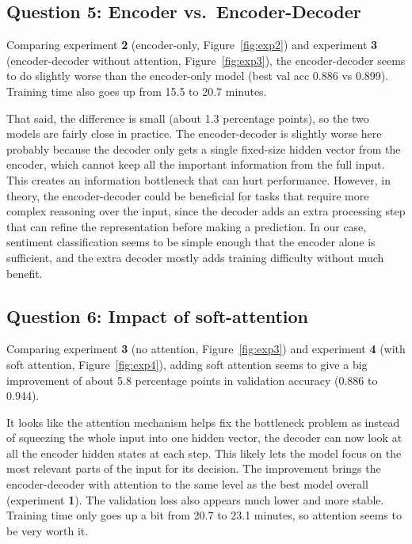\documentclass{article}
\begin{document}
\subsection*{Question 5: Encoder vs.\ Encoder-Decoder}

Comparing experiment \textbf{2} (encoder-only, Figure~\ref{fig:exp2}) and experiment \textbf{3} (encoder-decoder without attention, Figure~\ref{fig:exp3}), the encoder-decoder seems to do slightly worse than the encoder-only model (best val acc 0.886 vs 0.899). Training time also goes up from 15.5 to 20.7 minutes.

That said, the difference is small (about 1.3 percentage points), so the two models are fairly close in practice. The encoder-decoder is slightly worse here probably because the decoder only gets a single fixed-size hidden vector from the encoder, which cannot keep all the important information from the full input. This creates an information bottleneck that can hurt performance. However, in theory, the encoder-decoder could be beneficial for tasks that require more complex reasoning over the input, since the decoder adds an extra processing step that can refine the representation before making a prediction. In our case, sentiment classification seems to be simple enough that the encoder alone is sufficient, and the extra decoder mostly adds training difficulty without much benefit.

\subsection*{Question 6: Impact of soft-attention}

Comparing experiment \textbf{3} (no attention, Figure~\ref{fig:exp3}) and experiment \textbf{4} (with soft attention, Figure~\ref{fig:exp4}), adding soft attention seems to give a big improvement of about 5.8 percentage points in validation accuracy (0.886 to 0.944).

It looks like the attention mechanism helps fix the bottleneck problem as instead of squeezing the whole input into one hidden vector, the decoder can now look at all the encoder hidden states at each step. This likely lets the model focus on the most relevant parts of the input for its decision. The improvement brings the encoder-decoder with attention to the same level as the best model overall (experiment \textbf{1}). The validation loss also appears much lower and more stable. Training time only goes up a bit from 20.7 to 23.1 minutes, so attention seems to be very worth it.
\end{document}
